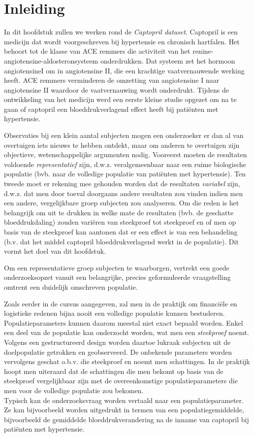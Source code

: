 \documentclass[
  12pt,dutch]{book}
\theoremstyle{definition}
\theoremstyle{definition}
\theoremstyle{definition}
\theoremstyle{definition}
\theoremstyle{remark}
\begin{document}
\section{Inleiding}\label{inleiding-4}

In dit hoofdstuk zullen we werken rond de \emph{Captopril dataset}.
Captopril is een medicijn dat wordt voorgeschreven bij hypertensie en chronisch hartfalen. Het behoort tot de klasse van ACE remmers die activiteit van het renine-angiotensine-aldosteronsysteem onderdrukken. Dat systeem zet het hormoon angiotensineI om in angiotensine II, die een krachtige vaatvernauwende werking heeft. ACE remmers verminderen de omzetting van angiotensine I naar angiotensine II waardoor de vaatvernauwing wordt onderdrukt. Tijdens de ontwikkeling van het medicijn werd een eerste kleine studie opgezet om na te gaan of captopril een bloeddrukverlagend effect heeft bij patiënten met hypertensie.

Observaties bij een klein aantal subjecten mogen een onderzoeker er dan al van overtuigen iets nieuws te hebben ontdekt, maar om anderen te overtuigen zijn objectieve, wetenschappelijke argumenten nodig.
Vooreerst moeten de
resultaten voldoende \emph{representatief} zijn, d.w.z. veralgemeenbaar
naar een ruime biologische populatie (bvb. naar de volledige populatie van patiënten met hypertensie).
Ten tweede moet er rekening mee gehouden worden dat de resultaten \emph{variabel} zijn, d.w.z. dat men
door toeval doorgaans andere resultaten zou vinden indien men een andere, vergelijkbare
groep subjecten zou analyseren.
Om die reden is het belangrijk om uit te drukken in welke mate de resultaten
(bvb. de geschatte bloeddrukdaling) zouden variëren van steekproef tot steekproef en of men op basis van de steekproef kan aantonen dat er een effect is van een behandeling (b.v. dat het middel captopril bloeddrukverlagend werkt in de populatie).
Dit vormt het doel van dit hoofdstuk.

Om een representatieve groep subjecten te waarborgen, vertrekt een goede
onderzoeksopzet vanuit een belangrijke, precies geformuleerde vraagstelling
omtrent een duidelijk omschreven populatie.

Zoals eerder in de cursus aangegeven, zal men in de praktijk om financiële en logistieke redenen bijna nooit een
volledige populatie kunnen bestuderen.
Populatieparameters kunnen daarom meestal
niet exact bepaald worden. Enkel een deel van de populatie kan onderzocht
worden, wat men een \emph{steekproef} noemt. Volgens een
gestructureerd design worden daartoe lukraak subjecten uit de doelpopulatie
getrokken en geobserveerd. De onbekende parameters worden vervolgens geschat
o.b.v. die steekproef en noemt men schattingen. In de praktijk hoopt men uiteraard dat de schattingen die men bekomt op basis van de steekproef vergelijkbaar zijn met de overeenkomstige populatieparameters die men voor de volledige populatie zou bekomen.\\
Typisch kan de onderzoeksvraag worden vertaald naar een populatieparameter.
Ze kan bijvoorbeeld worden uitgedrukt in termen van een populatiegemiddelde, bijvoorbeeld de gemiddelde bloeddrukverandering na de inname van captopril bij patiënten met hypertensie.
\end{document}
